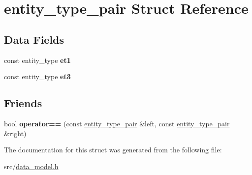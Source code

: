 \hypertarget{structentity__type__pair}{}\section{entity\+\_\+type\+\_\+pair Struct Reference}
\label{structentity__type__pair}
\subsection*{Data Fields}
\begin{DoxyCompactItemize}
\item 
const entity\+\_\+type {\bfseries et1}\hypertarget{structentity__type__pair_aac00f0d65f32a57745f708c2b1cd9b1f}{}\label{structentity__type__pair_aac00f0d65f32a57745f708c2b1cd9b1f}

\item 
const entity\+\_\+type {\bfseries et3}\hypertarget{structentity__type__pair_af1298e0bc96d48d5ae9b6bcdd0430ea3}{}\label{structentity__type__pair_af1298e0bc96d48d5ae9b6bcdd0430ea3}

\end{DoxyCompactItemize}
\subsection*{Friends}
\begin{DoxyCompactItemize}
\item 
bool {\bfseries operator==} (const \hyperlink{structentity__type__pair}{entity\+\_\+type\+\_\+pair} \&left, const \hyperlink{structentity__type__pair}{entity\+\_\+type\+\_\+pair} \&right)\hypertarget{structentity__type__pair_ab148ef41047fcbd537a8f98b11e11045}{}\label{structentity__type__pair_ab148ef41047fcbd537a8f98b11e11045}

\end{DoxyCompactItemize}


The documentation for this struct was generated from the following file\+:\begin{DoxyCompactItemize}
\item 
src/\hyperlink{data__model_8h}{data\+\_\+model.\+h}\end{DoxyCompactItemize}

